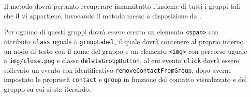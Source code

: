 \begin{description}
  Il metodo dovrà pertanto recuperare innanzitutto l'insieme di tutti i gruppi tali che il  vi appartiene, invocando il metodo  messo a disposizione da .
  
  Per ognuno di questi gruppi dovrà essere creato un elemento \verb'<span>' con attributo \verb'class' uguale a \verb'groupLabel', il quale dovrà contenere al proprio interno un nodo di testo con il nome del gruppo e un elemento \verb'<img>' con percorso uguale a \verb'img/close.png' e classe \verb'deleteGroupButton', al cui evento \verb'click' dovrà essere sollevato un evento con identificativo \verb'removeContactFromGroup', dopo averne impostato le proprietà \verb'contact' e \verb'group' in funzione del contatto visualizzato e del gruppo su cui si sta iterando.
  
\end{description}

